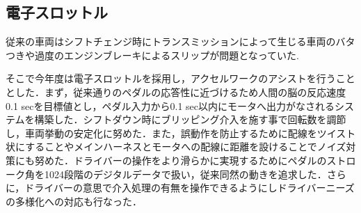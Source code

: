 \subsection{電子スロットル}
従来の車両はシフトチェンジ時にトランスミッションによって生じる車両のバタつきや過度のエンジンブレーキによるスリップが問題となっていた.

そこで今年度は電子スロットルを採用し，アクセルワークのアシストを行うこととした．まず，従来通りのペダルの応答性に近づけるため人間の脳の反応速度0.1 secを目標値とし，ペダル入力から0.1 sec以内にモータへ出力がなされるシステムを構築した．シフトダウン時にブリッピング介入を施す事で回転数を調節し，車両挙動の安定化に努めた．また，誤動作を防止するために配線をツイスト状にすることやメインハーネスとモータへの配線に距離を設けることでノイズ対策にも努めた．ドライバーの操作をより滑らかに実現するためにペダルのストローク角を1024段階のデジタルデータで扱い，従来同然の動きを追求した．さらに，ドライバーの意思で介入処理の有無を操作できるようにしドライバーニーズの多様化への対応も行なった．

